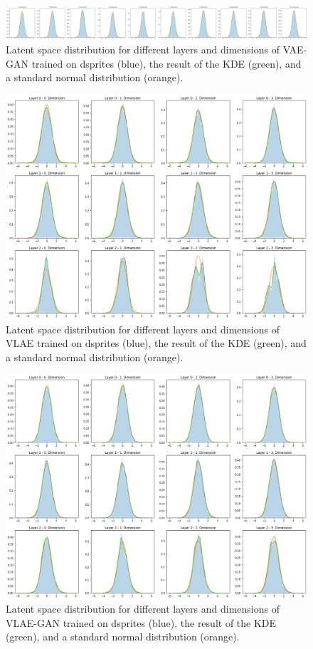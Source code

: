 \documentclass[11pt,a4paper]{article}
\begin{document}
\begin{figure}[H]
\centering
\includegraphics[width=.8\textwidth]{images/generated_vs_true/dsprites/vae_gan_kde.png}
\caption[\ac{VAE}-\ac{GAN} on dsprites: Estimated Latent Space Distribution]{Latent space distribution for different layers and dimensions of \ac{VAE}-\ac{GAN} trained on dsprites (blue), the result of the \ac{KDE} (green), and a standard normal distribution (orange).}
\end{figure}


\begin{figure}[H]
\centering
\includegraphics[width=.8\textwidth]{images/generated_vs_true/dsprites/vlae_kde.png}
\caption[\ac{VLAE} on dsprites: Estimated Latent Space Distribution]{Latent space distribution for different layers and dimensions of \ac{VLAE} trained on dsprites (blue), the result of the \ac{KDE} (green), and a standard normal distribution (orange).}
\end{figure}

\begin{figure}[H]
\centering
\includegraphics[width=.8\textwidth]{images/generated_vs_true/dsprites/vlae_gan_kde.png}
\caption[\ac{VLAE}-\ac{GAN} on dsprites: Estimated Latent Space Distribution]{Latent space distribution for different layers and dimensions of \ac{VLAE}-\ac{GAN} trained on dsprites (blue), the result of the \ac{KDE} (green), and a standard normal distribution (orange).}
\end{figure}
\end{document}
